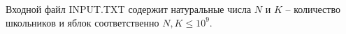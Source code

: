 Входной файл INPUT.TXT содержит натуральные числа $N$ и $K$ -- количество школьников и яблок соответственно $N, K \leq 10^9$.